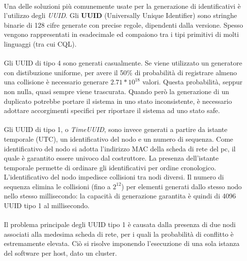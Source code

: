 \documentclass[11pt,a4paper,english]{article}
\begin{document}
\paragraph{} Una delle soluzioni più comunemente usate per la generazione di identificativi è l'utilizzo degli \emph{UUID}. Gli \textbf{UUID} (Universally Unique Identifier) sono stringhe binarie di 128 cifre generate con precise regole, dipendenti dalla versione. Spesso vengono rappresentati in esadecimale ed compaiono tra i tipi primitivi di molti linguaggi (tra cui CQL).

\paragraph{} Gli UUID di tipo 4 sono generati casualmente. Se viene utilizzato un generatore con distibuzione uniforme, per avere il 50\% di probabilità di registrare almeno una collisione è necessario generare $2.71*10^{18}$ valori. Questa probabilità, seppur non nulla, quasi sempre viene trascurata. Quando però la generazione di un duplicato potrebbe portare il sistema in uno stato inconsistente, è necessario adottare accorgimenti specifici per riportare il sistema ad uno stato safe. 

\paragraph{} Gli UUID di tipo 1, o \emph{TimeUUID}, sono invece generati a partire da istante temporale (UTC), un identificativo del nodo e un numero di sequenza. Come identificativo del nodo si adotta l'indirizzo MAC della scheda di rete del pc, il quale è garantito essere univoco dal costruttore. La presenza dell'istante temporale permette di ordinare gli identificativi per ordine cronologico. L'identificativo del nodo impedisce collisioni tra nodi diversi. Il numero di sequenza elimina le collisioni (fino a $2^{12}$) per elementi generati dallo stesso nodo nello stesso millisecondo: la capacità di generazione garantita è quindi di 4096 UUID tipo 1 al millisecondo. 

\paragraph{} Il problema principale degli UUID tipo 1 è causata dalla presenza di due nodi associati alla medesima scheda di rete, per i quali la probabilità di conflitto è estremamente elevata. Ciò si risolve imponendo l'esecuzione di una sola istanza del software per host, dato un cluster.   
\end{document}
